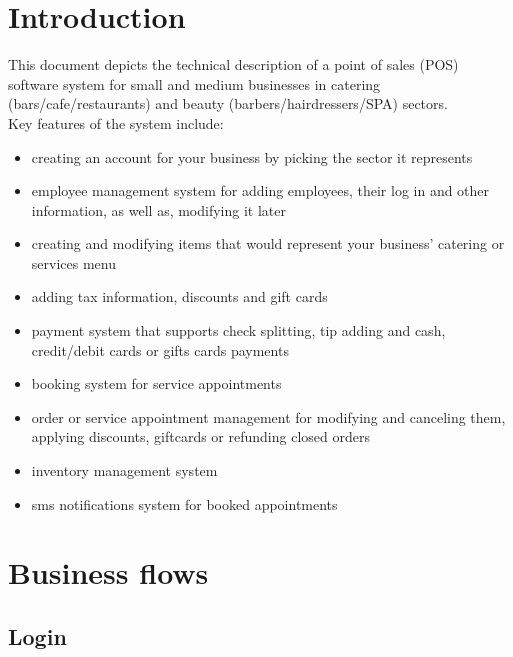 \documentclass{article}
\begin{document}
    
    \newpage
    \tableofcontents
    \newpage
    \section{Introduction}
    This document depicts the technical description of a point of sales (POS) software system for small and medium businesses in catering (bars/cafe/restaurants) and beauty (barbers/hairdressers/SPA) sectors.\\[0.2cm] Key features of the system include:
    \begin{itemize}
        \item creating an account for your business by picking the sector it represents
        \item employee management system for adding employees, their log in and other information, as well as, modifying it later
        \item creating and modifying items that would represent your business' catering or services menu
        \item adding tax information, discounts and gift cards
        \item payment system that supports check splitting, tip adding and cash, credit/debit cards or gifts cards payments
        \item booking system for service appointments
        \item order or service appointment management for modifying and canceling them, applying discounts, giftcards or refunding closed orders
        \item inventory management system
        \item sms notifications system for booked appointments
    \end{itemize}

    \section{Business flows}
    
    \subsection{Login}
\end{document}
